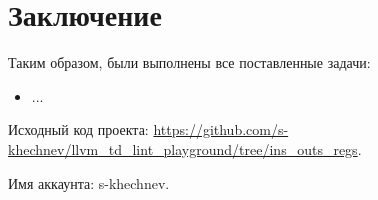 
\section*{Заключение}

Таким образом, были выполнены все поставленные задачи:
\begin{itemize}
    \item ...
\end{itemize}

Исходный код проекта: \url{https://github.com/s-khechnev/llvm_td_lint_playground/tree/ins_outs_regs}.

Имя аккаунта: s-khechnev.





